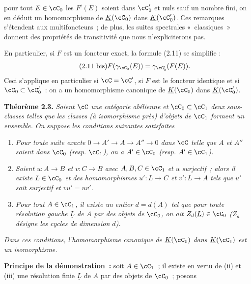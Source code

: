 pour tout $E\in\cC_0$ les $F^i(E)$ soient dans $\cC'_0$ et nuls sauf un nombre fini, on en déduit un homomorphisme de $\underline{K}(\cC_0)$ dans $\underline{K}(\cC'_0)$. Ces remarques s'étendent aux multifoncteurs~; de plus, les suites spectrales «~classiques~» donnent des propriétés de transitivité que nous n'expliciterons pas.

En particulier, si $F$ est un foncteur exact, la formule (2.11) se simplifie :
\begin{equation}\tag{2.11 bis}
 F(\gamma_{\cC_0}(E))=\gamma_{\cC'_0}(F(E)).
\end{equation}
Ceci s'applique en particulier si $\cC=\cC'$, si $F$ est le foncteur identique et si $\cC_0\subset\cC'_0$~: on a un homomorphisme canonique de $\underline{K}(\cC_0)$ dans $\underline{K}(\cC'_0)$.

\textbf{Théorème 2.3.} \emph{Soient $\cC$ une catégorie abélienne et $\cC_0\subset\cC_1$ deux sous-classes telles que les classes (à isomorphisme près) d'objets de $\cC_1$ forment un ensemble. On suppose les conditions suivantes satisfaites}
\begin{enumerate}[label=(\roman*)]
\item \emph{Pour toute suite exacte $0\to A'\to A\to A''\to0$ dans $\cC$ telle que $A$ et $A''$ soient dans $\cC_0$ (resp. $\cC_1$), on a $A'\in\cC_0$ (resp. $A'\in\cC_1$).}
\item \emph{Soient $u:A\to B$ et $v:C\to B$ avec $A,B,C\in\cC_1$ et $u$ surjectif~; alors il existe $L\in\cC_0$ et des homomorphismes $u':L\to C$ et $v':L\to A$ tels que $u'$ soit surjectif et $vu'=uv'$.}
\item \emph{Pour tout $A\in\cC_1$, il existe un entier $d=d(A)$ tel que pour toute résolution gauche $\underline{L}$ de $A$ par des objets de $\cC_0$, on ait $Z_d(\underline{L})\in\cC_0$ ($Z_d$ désigne les cycles de dimension $d$).}
\end{enumerate}
\emph{Dans ces conditions, l'homomorphisme canonique de $\underline{K}(\cC_0)$ dans $\underline{K}(\cC_1)$ est un isomorphisme.}

\textbf{Principe de la démonstration~:} soit $A\in\cC_1$~; il existe en vertu de (ii) et (iii) une résolution finie $\underline{L}$ de $A$ par des objets de $\cC_0$~; posons

